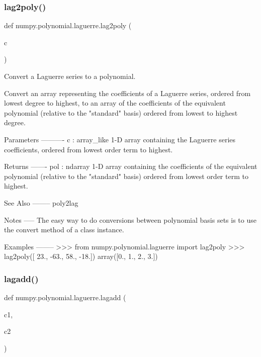 \subsubsection{\texorpdfstring{lag2poly()}{lag2poly()}}
{\footnotesize\ttfamily def numpy.\+polynomial.\+laguerre.\+lag2poly (\begin{DoxyParamCaption}\item[{}]{c }\end{DoxyParamCaption})}

\begin{DoxyVerb}Convert a Laguerre series to a polynomial.

Convert an array representing the coefficients of a Laguerre series,
ordered from lowest degree to highest, to an array of the coefficients
of the equivalent polynomial (relative to the "standard" basis) ordered
from lowest to highest degree.

Parameters
----------
c : array_like
    1-D array containing the Laguerre series coefficients, ordered
    from lowest order term to highest.

Returns
-------
pol : ndarray
    1-D array containing the coefficients of the equivalent polynomial
    (relative to the "standard" basis) ordered from lowest order term
    to highest.

See Also
--------
poly2lag

Notes
-----
The easy way to do conversions between polynomial basis sets
is to use the convert method of a class instance.

Examples
--------
>>> from numpy.polynomial.laguerre import lag2poly
>>> lag2poly([ 23., -63.,  58., -18.])
array([0., 1., 2., 3.])\end{DoxyVerb}
 \mbox{\label{namespacenumpy_1_1polynomial_1_1laguerre_af98318d9266d2cedd1c3cb46e8041f27}} 
\subsubsection{\texorpdfstring{lagadd()}{lagadd()}}
{\footnotesize\ttfamily def numpy.\+polynomial.\+laguerre.\+lagadd (\begin{DoxyParamCaption}\item[{}]{c1,  }\item[{}]{c2 }\end{DoxyParamCaption})}

